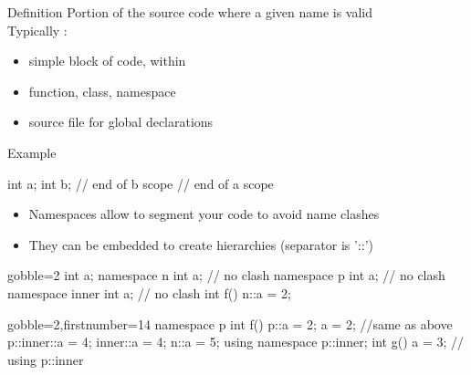 \begin{frame}[fragile]
  \begin{block}{Definition}
    Portion of the source code where a given name is valid \\
    Typically :
    \begin{itemize}
    \item simple block of code, within \texttt{{}}
    \item function, class, namespace
    \item source file for global declarations
    \end{itemize}
  \end{block}
  \begin{exampleblock}{Example}
    \begin{cppcode*}{}
      { int a;
        { int b;
        } // end of b scope
      } // end of a scope
    \end{cppcode*}
  \end{exampleblock}
\end{frame}

\begin{frame}[fragile]
  \begin{itemize}
  \item Namespaces allow to segment your code to avoid name clashes
  \item They can be embedded to create hierarchies (separator is '::')
  \end{itemize}
  \begin{multicols}{2}
    \begin{cppcode*}{gobble=2}
      int a;
      namespace n {
        int a;   // no clash
      }
      namespace p {
        int a;   // no clash
        namespace inner {
          int a; // no clash
        }
      }
      int f() {
        n::a = 2;
      }
    \end{cppcode*}
    \columnbreak
    \begin{cppcode*}{gobble=2,firstnumber=14}
      namespace p {
        int f() {
          p::a = 2;
          a = 2;  //same as above
          p::inner::a = 4;
          inner::a = 4;
          n::a = 5;
        }
      }
      using namespace p::inner;
      int g() {
        a = 3; // using p::inner
      }
  \end{cppcode*}
  \end{multicols}
\end{frame}

